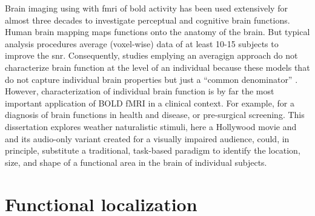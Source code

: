



%
Brain imaging using with \ac{fmri} of \ac{bold} activity has been used
extensively for almost three decades to investigate perceptual and cognitive
brain functions.
%
Human brain mapping maps functions onto the anatomy of the brain.
%
But typical analysis procedures average (voxel-wise) data of at least 10-15
subjects to improve the \ac{snr}.
%
Consequently, studies emplying an averagign approach do not characterize brain
function at the level of an individual because these models that do not capture
individual brain properties but just a ``common denominator''
\citep{dubois2016building}. 
%
However, characterization of individual brain function is by far the most
important application of BOLD fMRI in a clinical context.
%
For example, for a diagnosis of brain functions in health and disease, or
pre-surgical screening.
%
This dissertation explores weather naturalistic stimuli, here a Hollywood movie
and and its audio-only variant created for a visually impaired audience, could,
in principle, substitute a traditional, task-based paradigm to identify
the location, size, and shape of a functional area in the brain of individual
subjects.



\section{Functional localization}



